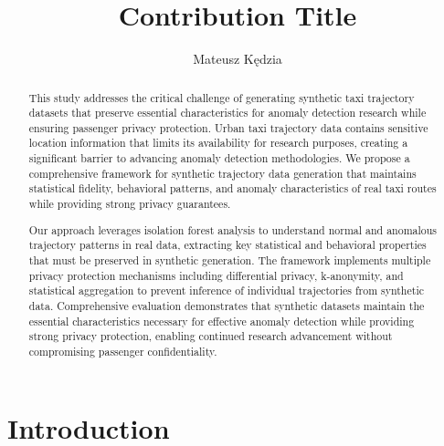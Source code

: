 \documentclass[runningheads]{llncs}
\begin{document}

\title{Contribution Title}
\author{Mateusz Kędzia}
\maketitle

\begin{abstract}
This study addresses the critical challenge of generating synthetic taxi trajectory datasets that preserve essential characteristics for anomaly detection research while ensuring passenger privacy protection. Urban taxi trajectory data contains sensitive location information that limits its availability for research purposes, creating a significant barrier to advancing anomaly detection methodologies. We propose a comprehensive framework for synthetic trajectory data generation that maintains statistical fidelity, behavioral patterns, and anomaly characteristics of real taxi routes while providing strong privacy guarantees.

Our approach leverages isolation forest analysis to understand normal and anomalous trajectory patterns in real data, extracting key statistical and behavioral properties that must be preserved in synthetic generation. The framework implements multiple privacy protection mechanisms including differential privacy, k-anonymity, and statistical aggregation to prevent inference of individual trajectories from synthetic data. Comprehensive evaluation demonstrates that synthetic datasets maintain the essential characteristics necessary for effective anomaly detection while providing strong privacy protection, enabling continued research advancement without compromising passenger confidentiality.

\end{abstract}

\newpage


\section{Introduction}
\label{sec:introduction}

\begin{compactoutline}
\end{compactoutline}
\end{document}
